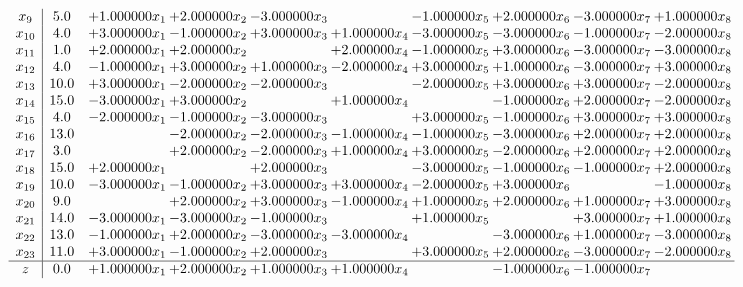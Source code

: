 \documentclass[10pt]{article}
\begin{document}
\[\begin{array}{c| c c@{\hskip 2pt} c@{\hskip 2pt} c@{\hskip 2pt} c@{\hskip 2pt} c@{\hskip 2pt} c@{\hskip 2pt} c@{\hskip 2pt} c@{\hskip 2pt} }
 x_{9}   &  5.0 & + 1.000000 x_{1} & + 2.000000 x_{2} & -3.000000 x_{3} &   & -1.000000 x_{5} & + 2.000000 x_{6} & -3.000000 x_{7} & + 1.000000 x_{8}\\
 x_{10}   &  4.0 & + 3.000000 x_{1} & -1.000000 x_{2} & + 3.000000 x_{3} & + 1.000000 x_{4} & -3.000000 x_{5} & -3.000000 x_{6} & -1.000000 x_{7} & -2.000000 x_{8}\\
 x_{11}   &  1.0 & + 2.000000 x_{1} & + 2.000000 x_{2} &   & + 2.000000 x_{4} & -1.000000 x_{5} & + 3.000000 x_{6} & -3.000000 x_{7} & -3.000000 x_{8}\\
 x_{12}   &  4.0 & -1.000000 x_{1} & + 3.000000 x_{2} & + 1.000000 x_{3} & -2.000000 x_{4} & + 3.000000 x_{5} & + 1.000000 x_{6} & -3.000000 x_{7} & + 3.000000 x_{8}\\
 x_{13}   &  10.0 & + 3.000000 x_{1} & -2.000000 x_{2} & -2.000000 x_{3} &   & -2.000000 x_{5} & + 3.000000 x_{6} & + 3.000000 x_{7} & -2.000000 x_{8}\\
 x_{14}   &  15.0 & -3.000000 x_{1} & + 3.000000 x_{2} &   & + 1.000000 x_{4} &   & -1.000000 x_{6} & + 2.000000 x_{7} & -2.000000 x_{8}\\
 x_{15}   &  4.0 & -2.000000 x_{1} & -1.000000 x_{2} & -3.000000 x_{3} &   & + 3.000000 x_{5} & -1.000000 x_{6} & + 3.000000 x_{7} & + 3.000000 x_{8}\\
 x_{16}   &  13.0  &   & -2.000000 x_{2} & -2.000000 x_{3} & -1.000000 x_{4} & -1.000000 x_{5} & -3.000000 x_{6} & + 2.000000 x_{7} & + 2.000000 x_{8}\\
 x_{17}   &  3.0  &   & + 2.000000 x_{2} & -2.000000 x_{3} & + 1.000000 x_{4} & + 3.000000 x_{5} & -2.000000 x_{6} & + 2.000000 x_{7} & + 2.000000 x_{8}\\
 x_{18}   &  15.0 & + 2.000000 x_{1} &   & + 2.000000 x_{3} &   & -3.000000 x_{5} & -1.000000 x_{6} & -1.000000 x_{7} & + 2.000000 x_{8}\\
 x_{19}   &  10.0 & -3.000000 x_{1} & -1.000000 x_{2} & + 3.000000 x_{3} & + 3.000000 x_{4} & -2.000000 x_{5} & + 3.000000 x_{6} &   & -1.000000 x_{8}\\
 x_{20}   &  9.0  &   & + 2.000000 x_{2} & + 3.000000 x_{3} & -1.000000 x_{4} & + 1.000000 x_{5} & + 2.000000 x_{6} & + 1.000000 x_{7} & + 3.000000 x_{8}\\
 x_{21}   &  14.0 & -3.000000 x_{1} & -3.000000 x_{2} & -1.000000 x_{3} &   & + 1.000000 x_{5} &   & + 3.000000 x_{7} & + 1.000000 x_{8}\\
 x_{22}   &  13.0 & -1.000000 x_{1} & + 2.000000 x_{2} & -3.000000 x_{3} & -3.000000 x_{4} &   & -3.000000 x_{6} & + 1.000000 x_{7} & -3.000000 x_{8}\\
 x_{23}   &  11.0 & + 3.000000 x_{1} & -1.000000 x_{2} & + 2.000000 x_{3} &   & + 3.000000 x_{5} & + 2.000000 x_{6} & -3.000000 x_{7} & -2.000000 x_{8}\\
\hline
z    &  0.0 & + 1.000000 x_{1} & + 2.000000 x_{2} & + 1.000000 x_{3} & + 1.000000 x_{4} &   & -1.000000 x_{6} & -1.000000 x_{7} &   \\
\end{array}\]
\end{document}
